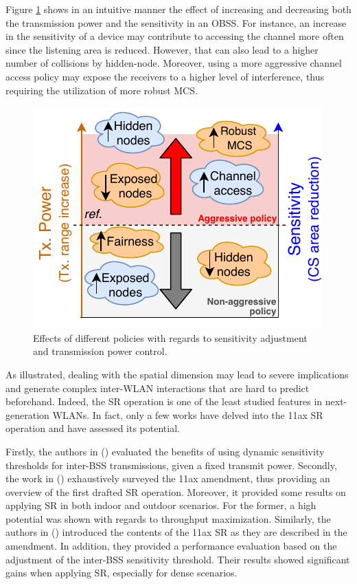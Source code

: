 \documentclass[preprint,12pt]{elsarticle}
\begin{document}
	Figure \ref{fig:policies_sr} shows in an intuitive manner the effect of increasing and decreasing both the transmission power and the sensitivity in an OBSS. For instance, an increase in the sensitivity of a device may contribute to accessing the channel more often since the listening area is reduced. However, that can also lead to a higher number of collisions by hidden-node. Moreover, using a more aggressive channel access policy may expose the receivers to a higher level of interference, thus requiring the utilization of more robust MCS.
	\begin{figure}[ht!]
		\centering
		\includegraphics[width=0.4\columnwidth]{policies_sr}
		\caption{Effects of different policies with regards to sensitivity adjustment and transmission power control.}
		\label{fig:policies_sr}
	\end{figure}
	
	As illustrated, dealing with the spatial dimension may lead to severe implications and generate complex inter-WLAN interactions that are hard to predict beforehand. Indeed, the SR operation is one of the least studied features in next-generation WLANs. In fact, only a few works have delved into the 11ax SR operation and have assessed its potential. 
	
	Firstly, the authors in (\citealp{mori2014performance}) evaluated the benefits of using dynamic sensitivity thresholds for inter-BSS transmissions, given a fixed transmit power. Secondly, the work in (\citealp{qu2018survey}) exhaustively surveyed the 11ax amendment, thus providing an overview of the first drafted SR operation. Moreover, it provided some results on applying SR in both indoor and outdoor scenarios. For the former, a high potential was shown with regards to throughput maximization. Similarly, the authors in (\citealp{shen2018research}) introduced the contents of the 11ax SR as they are described in the amendment. In addition, they provided a performance evaluation based on the adjustment of the inter-BSS sensitivity threshold. Their results showed significant gains when applying SR, especially for dense scenarios. 
	
\end{document}
